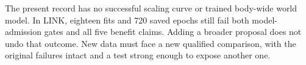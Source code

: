 The present record has no successful scaling curve or trained body-wide world model. In LINK, eighteen fits and 720 saved epochs still fail both model-admission gates and all five benefit claims. Adding a broader proposal does not undo that outcome. New data must face a new qualified comparison, with the original failures intact and a test strong enough to expose another one.
